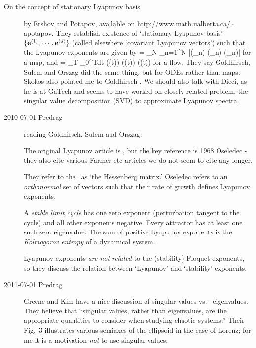 \begin{description}
\item[On the concept of stationary {L}yapunov basis] by Ershov
and Potapov, available on
{http://www.math.ualberta.ca/$\sim$apotapov}. They establish
existence of `stationary {L}yapunov basis'					\toCB
$\{\jEigvec[1],\cdots,\jEigvec[d]\}$ (called elsewhere `covariant
Lyapunov vectors') such that the Lyapunov
exponents are given by										\toCB
\beq
    \eigExp[j] = \lim_{N \to \infty} 
         \sum_{n=1}^{N} \ln
    |\jEigvecT[j](\ssp_n) \jMps(\ssp_n) \jEigvec[j](\ssp_n)|
for a map, and
\beq
    \eigExp[j] = \lim_{T \to \infty} 
         \int_0^{T}dt
    \jEigvecT[j](\ssp(t)) \Mvar(\ssp(t)) \jEigvec[j](\ssp(t))
for a flow.
They say Goldhirsch, Sulem and Orszag
did the same thing, but for ODEs rather than maps.
Skokos also pointed me to Goldhirsch \etal. We should also
talk with Dieci,
as he is at GaTech and seems to have
worked on closely related problem, the singular value decomposition
(SVD) to approximate Lyapunov spectra.

\item[2010-07-01 Predrag] reading
Goldhirsch, Sulem and Orszag:

The original Lyapunov article is ,
but the key reference is 1968 Oseledec -
they also cite various Farmer etc articles we do not seem to
cite any longer.

They refer to the \stabmat\ as `the Hessenberg matrix.'
    										\toCB
Oseledec refers to an {\em orthonormal} set of vectors such
that their rate of growth defines Lyapunov exponents.

A \emph{stable limit cycle} has one zero exponent   \inCB
(perturbation tangent to the
cycle) and all other exponents negative.
Every attractor has at least one such zero eigenvalue.
										\toCB
The sum of positive Lyapunov exponents is the
\emph{Kolmogorov entropy} of a dynamical system.

Lyapunov exponents \emph{are not related} to the (stability)
Floquet exponents, so they discuss the relation between
`Lyapunov' and `stability' exponents.
						\toCB

\item[2011-07-01 Predrag]
Greene and Kim have a nice discussion of singular
values vs. \jacobianM\ eigenvalues. They believe that ``singular values,
rather than eigenvalues, are the appropriate quantities to consider
when studying chaotic systems.'' Their Fig.~3 illustrates various semiaxes
of the ellipsoid in the case of Lorenz; for me it is a motivation {\em not}
to use singular values.
						\toCB


\end{description}
